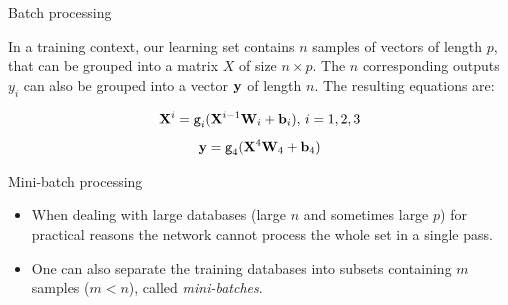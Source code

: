 \documentclass[handout,xcolor=pdftex,dvipsnames,table,mathserif]{beamer}
\begin{document}

\begin{frame}{Batch processing}

  In a training context, our learning set contains $n$ samples of vectors of length $p$, that can be grouped into a matrix $X$ of size $n \times p$. The $n$ corresponding outputs $y_i$ can also be grouped into a vector $\mathbf{y}$ of length $n$. The resulting equations are:

  \begin{block}{}
    \[\mathbf{X}^i = \texttt{g}_i(\mathbf{X}^{i-1}\mathbf{W}_i + \mathbf{b}_i),\, i= 1, 2, 3 \]
    \[\mathbf{y} = \texttt{g}_4(\mathbf{X}^4\mathbf{W}_4 + \mathbf{b}_4)\]
  \end{block}


\end{frame}

\begin{frame}{Mini-batch processing}

  \begin{itemize}[<+->]
  \item   When dealing with large databases (large $n$ and sometimes large $p$) for practical reasons the network cannot process the whole set in a single pass.
  \item   One can also separate the training databases into subsets containing $m$ samples ($m < n$), called \emph{mini-batches}.
\end{itemize}


\end{frame}
\end{document}
